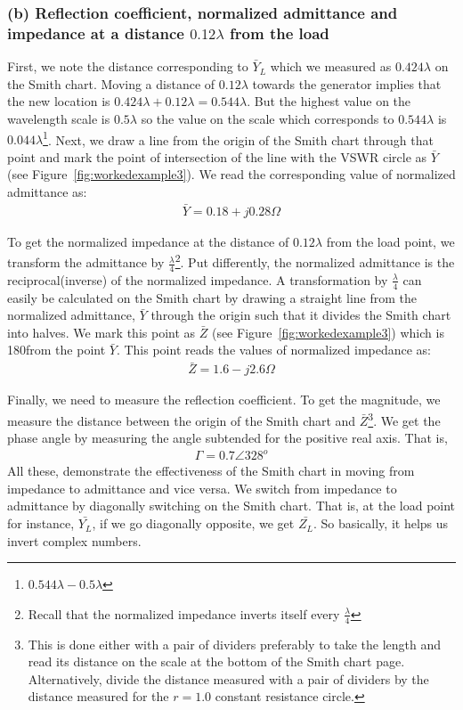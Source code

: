 \begin{exmp}
\subsubsection*{(b) Reflection coefficient, normalized admittance and impedance at a distance $0.12\lambda$ from the load}
First, we note the distance corresponding to $\bar{Y}_L$ which we measured as $0.424\lambda$ on the Smith chart. Moving a distance of $0.12\lambda$ towards the generator implies that the new location is $0.424\lambda + 0.12\lambda = 0.544\lambda$. But the highest value on the wavelength scale is $0.5\lambda$ so the value on the scale which corresponds to $0.544\lambda$ is $0.044\lambda$\footnote{
$0.544\lambda-0.5\lambda$
}. Next, we draw a line from the origin of the Smith chart through that point and mark the point of intersection of the line with the VSWR circle as $\bar{Y}$ (see Figure~\ref{fig:workedexample3}). We read the corresponding value of normalized admittance as:
\begin{align*}
\bar{Y} = 0.18 + j0.28\Omega
\end{align*}

To get the normalized impedance at the distance of $0.12\lambda$ from the load point, we transform the admittance by $\frac{\lambda}{4}$\footnote{
Recall that the normalized impedance inverts itself every $\frac{\lambda}{4}$
}. Put differently, the normalized admittance is the reciprocal(inverse) of the normalized impedance. A transformation by $\frac{\lambda}{4}$ can easily be calculated on the Smith chart by drawing a straight line from the normalized admittance, $\bar{Y}$ through the origin such that it divides the Smith chart into halves. We mark this point as $\bar{Z}$ (see Figure~\ref{fig:workedexample3}) which is 180\textdegree from the point $\bar{Y}$. This point reads the values of normalized impedance as:
\begin{align*}
\bar{Z} = 1.6 - j2.6\Omega
\end{align*}

Finally, we need to measure the reflection coefficient. To get the magnitude, we measure the distance between the origin of the Smith chart and $\bar{Z}$\footnote{
This is done either with a pair of dividers preferably to take the length and read its distance on the scale at the bottom of the Smith chart page. Alternatively, divide the distance measured with a pair of dividers by the distance measured for the $r = 1.0$ constant resistance circle.
}. We get the phase angle by measuring the angle subtended for the positive real axis. That is,
\begin{align*}
\Gamma = 0.7\angle328^o
\end{align*}
All these, demonstrate the effectiveness of the Smith chart in moving from impedance to admittance and vice versa. We switch from impedance to admittance by diagonally switching on the Smith chart. That is, at the load point for instance, $\bar{Y_{L}}$, if we go diagonally opposite, we get $\bar{Z_{L}}$. So basically, it helps us invert complex numbers. 
\end{exmp}

